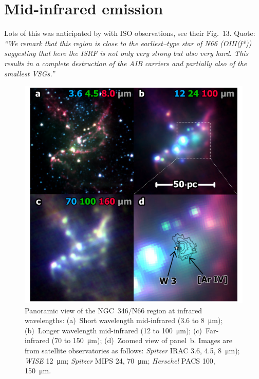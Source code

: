 \documentclass[twocolumn, times]{aastex631}
\begin{document}
\section{Mid-infrared emission}
\label{sec:mid-infr-emiss}

Lots of this was anticipated by \citet{Contursi:2000a} with ISO
observations, see their Fig.~13. Quote:
\textit{``We remark that this region is close
to the earliest–type star of N66 (OIII(f*)) suggesting that here
the ISRF is not only very strong but also very hard. This results
in a complete destruction of the AIB carriers and partially also
of the smallest VSGs.''}


\begin{figure}
  \centering
  \includegraphics[width=\linewidth]{figs/ngc346-infrared-multipanel}
  \caption{
    Panoramic view of the NGC~346/N66 region at infrared wavelengths:
    (a)~Short wavelength mid-infrared (\num{3.6} to \SI{8}{\um});
    (b)~Longer wavelength mid-infrared (\num{12} to \SI{100}{\um});
    (c)~Far-infrared (\num{70} to \SI{150}{\um});
    (d)~Zoomed view of panel~b.
    Images are from satellite observatories as follows:
    \textit{Spitzer} IRAC \num{3.6}, \num{4.5}, \SI{8}{\um});
    \textit{WISE} \SI{12}{\um};
    \textit{Spitzer} MIPS \num{24}, \SI{70}{\um};
    \textit{Herschel} PACS \num{100}, \SI{150}{\um}.
    }
  \label{fig:infrared-multipanel}
\end{figure}
\end{document}
